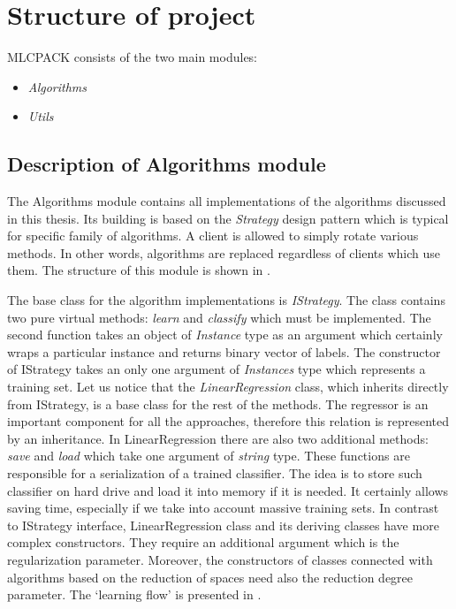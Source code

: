 \section{Structure of project}

MLCPACK consists of the two main modules:
\begin{itemize}
    \item \textit{Algorithms}
    \item \textit{Utils}
\end{itemize}

\subsection{Description of Algorithms module}

The Algorithms module contains all implementations of the algorithms discussed in this thesis. Its building is based on the \textit{Strategy} design pattern which is typical for specific family of algorithms. A client is allowed to simply rotate various methods. In other words, algorithms are replaced regardless of clients which use them. The structure of this module is shown in . 

The base class for the algorithm implementations is \textit{IStrategy}. The class contains two pure virtual methods: \textit{learn} and \textit{classify} which must be implemented. The second function takes an object of \textit{Instance} type as an argument which certainly wraps a particular instance and returns binary vector of labels. The constructor of IStrategy takes an only one argument of \textit{Instances} type which represents a training set. Let us notice that the \textit{LinearRegression} class, which inherits directly from IStrategy, is a base class for the rest of the methods. The regressor is an important component for all the approaches, therefore this relation is represented by an inheritance. In LinearRegression there are also two additional methods: \textit{save} and \textit{load} which take one argument of \textit{string} type. These functions are responsible for a serialization of a trained classifier. The idea is to store such classifier on hard drive and load it into memory if it is needed. It certainly allows saving time, especially if we take into account massive training sets. In contrast to IStrategy interface, LinearRegression class and its deriving classes have more complex constructors. They require an additional argument which is the regularization parameter. Moreover, the constructors of classes connected with algorithms based on the reduction of spaces need also the reduction degree parameter. The `learning flow' is presented in .

